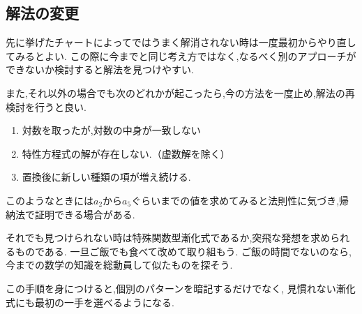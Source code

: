  \subsection{解法の変更}

  先に挙げたチャートによってではうまく解消されない時は一度最初からやり直してみるとよい.   
  この際に今までと同じ考え方ではなく,なるべく別のアプローチができないか検討すると解法を見つけやすい.

  また,それ以外の場合でも次のどれかが起こったら,今の方法を一度止め,解法の再検討を行うと良い.
  \begin{enumerate}
    \item 対数を取ったが,対数の中身が一致しない
    \item 特性方程式の解が存在しない.（虚数解を除く）
    \item 置換後に新しい種類の項が増え続ける.
  \end{enumerate}
  このようなときには$a_2$から$a_5$ぐらいまでの値を求めてみると法則性に気づき,帰納法で証明できる場合がある.
  

  それでも見つけられない時は特殊関数型漸化式であるか,突飛な発想を求められるものである.
  一旦ご飯でも食べて改めて取り組もう.
  ご飯の時間でないのなら,今までの数学の知識を総動員して似たものを探そう.
  
  この手順を身につけると,個別のパターンを暗記するだけでなく,
  見慣れない漸化式にも最初の一手を選べるようになる.